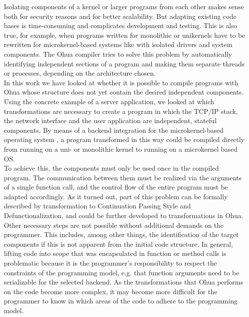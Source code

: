 Isolating components of a kernel or larger programs from each other makes sense both for security reasons and for better scalability. But adapting existing code bases is time-consuming and complicates development and testing. This is also true, for example, when programs written for monolithic or unikernels have to be rewritten for microkernel-based systems like \md with isolated drivers and system components. The Ohua compiler tries to solve this problem by automatically identifying independent sections of a program and making them separate threads or processes, depending on the architecture chosen.\\

In this work we have looked at whether it is possible to compile programs with Ohua whose structure does not yet contain the desired independent components. Using the concrete example of a server application, we looked at which transformations are necessary to create a program in which the TCP/IP stack, the network interface and the user application are independent, stateful components. By means of a backend integration for the microkernel-based operating system \md, a program transformed in this way could be compiled directly from running on a uni- or monolithic kernel to running on a microkernel based OS. \\

To achieve this, the components must only be used once in the compiled program. The communication between them must be realized via the arguments of a single function call, and the control flow of the entire program must be adapted accordingly. As it turned out, part of this problem can be formally described by transformation to Continuation Passing Style and Defunctionalization, and could be further developed to transformations in Ohua. Other necessary steps are not possible without additional demands on the programmer. This includes, among other things, the identification of the target components if this is not apparent from the initial code structure. In general, lifting code into scope that was encapsulated in function or method calls is problematic because it is the programmer's responsibility to respect the constraints of the programming model, e.g. that function arguments need to be serializable for the selected backend. As the transformations that Ohua performs on the code become more complex, it may become more difficult for the programmer to know in which areas of the code to adhere to the programming model. \\

